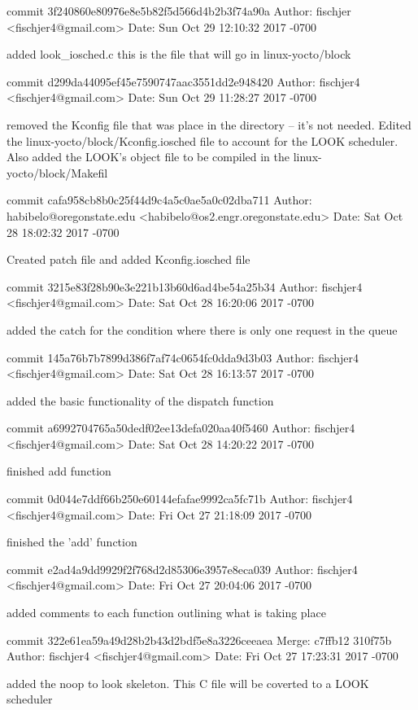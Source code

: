 commit 3f240860e80976e8e5b82f5d566d4b2b3f74a90a
Author: fischjer <fischjer4@gmail.com>
Date:   Sun Oct 29 12:10:32 2017 -0700

    added look_iosched.c this is the file that will go in linux-yocto/block

commit d299da44095ef45e7590747aac3551dd2e948420
Author: fischjer4 <fischjer4@gmail.com>
Date:   Sun Oct 29 11:28:27 2017 -0700

    removed the Kconfig file that was place in the directory -- it's not needed. Edited the linux-yocto/block/Kconfig.iosched file to account for the LOOK scheduler. Also added the LOOK's object file to be compiled in the linux-yocto/block/Makefil

commit cafa958cb8b0c25f44d9c4a5c0ae5a0c02dba711
Author: habibelo@oregonstate.edu <habibelo@os2.engr.oregonstate.edu>
Date:   Sat Oct 28 18:02:32 2017 -0700

    Created patch file and added Kconfig.iosched file

commit 3215e83f28b90e3e221b13b60d6ad4be54a25b34
Author: fischjer4 <fischjer4@gmail.com>
Date:   Sat Oct 28 16:20:06 2017 -0700

    added the catch for the condition where there is only one request in the queue

commit 145a76b7b7899d386f7af74c0654fc0dda9d3b03
Author: fischjer4 <fischjer4@gmail.com>
Date:   Sat Oct 28 16:13:57 2017 -0700

    added the basic functionality of the dispatch function

commit a6992704765a50dedf02ee13defa020aa40f5460
Author: fischjer4 <fischjer4@gmail.com>
Date:   Sat Oct 28 14:20:22 2017 -0700

    finished add function

commit 0d044e7ddf66b250e60144efafae9992ca5fc71b
Author: fischjer4 <fischjer4@gmail.com>
Date:   Fri Oct 27 21:18:09 2017 -0700

    finished the 'add' function

commit e2ad4a9dd9929f2f768d2d85306e3957e8eca039
Author: fischjer4 <fischjer4@gmail.com>
Date:   Fri Oct 27 20:04:06 2017 -0700

    added comments to each function outlining what is taking place

commit 322e61ea59a49d28b2b43d2bdf5e8a3226ceeaea
Merge: c7ffb12 310f75b
Author: fischjer4 <fischjer4@gmail.com>
Date:   Fri Oct 27 17:23:31 2017 -0700

    added the noop to look skeleton. This C file will be coverted to a LOOK scheduler

